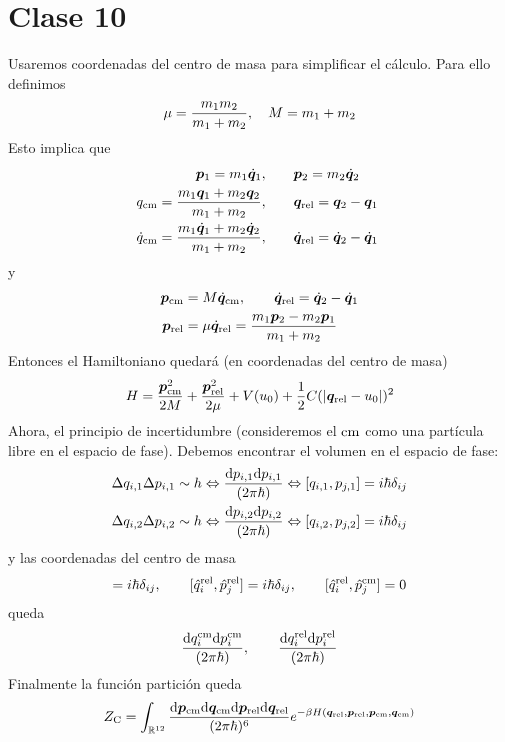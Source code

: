 \section{Clase 10}
Usaremos coordenadas del centro de masa para simplificar el cálculo. Para ello definimos
\begin{equation}
  \m =\frac{m_1m_2}{m_1+m_2},\quad M=m_1+m_2
\end{equation}
Esto implica que
\begin{align}
  \vec{p}_1=m_1\dot{\vec{q}}_1,&\qquad \vec{p}_2=m_2\dot{\vec{q}}_2\\
  q_{\rm cm}=\frac{m_1\vec{q}_1+m_2\vec{q}_2}{m_1+m_2},&\qquad \vec{q}_{\rm rel}=\vec{q}_2-\vec{q}_1\\
   \dot{q}_{\rm cm}=\frac{m_1\dot{\vec{q}}_1+m_2\dot{\vec{q}}_2}{m_1+m_2},&\qquad \dot{\vec{q}}_{\rm rel}=\dot{\vec{q}}_2-\dot{\vec{q}}_1\
\end{align}
y
\begin{align}
  \vec{p}_{\rm cm}&=M\dot{\vec{q}}_{\rm cm},\qquad \dot{\vec{q}}_{\rm rel}=\dot{\vec{q}}_2-\dot{\vec{q}}_1\\
  \vec{p}_{\rm rel}&=\m \dot{\vec{q}}_{\rm rel}=\frac{m_1\vec{p}_2-m_2\vec{p}_1}{m_1+m_2}
\end{align}
Entonces el Hamiltoniano quedará (en coordenadas del centro de masa)
\begin{equation}
  H=\frac{\vec{p}_{\rm cm}^2}{2M}+\frac{\vec{p}_{\rm rel}^2}{2\m }+V(u_0)+\frac{1}{2}C(|\vec	{q}_{\rm rel}-u_0|)^2
\end{equation}
Ahora, el principio de incertidumbre (consideremos el $\rm cm$ como una partícula libre en el espacio de fase). Debemos encontrar el volumen en el espacio de fase:
\begin{align}
  \Delta q_{i,1}\Delta p_{i,1}\sim h \Leftrightarrow\frac{\dd p_{i,1}\dd p_{i,1}}{(2\p \hbar)}\Leftrightarrow [q_{i,1},p_{j,1}]=i\hbar\delta_{ij}\\
  \Delta q_{i,2}\Delta p_{i,2}\sim h \Leftrightarrow\frac{\dd p_{i,2}\dd p_{i,2}}{(2\p \hbar)}\Leftrightarrow [q_{i,2},p_{j,2}]=i\hbar\delta_{ij}
\end{align}
y las coordenadas del centro de masa
\begin{align}
  [\hat{q}_i^{\rm cm},\hat{p}_j^{\rm cm}]=i\hbar\delta_{ij},\qquad [\hat{q}_i^{\rm rel},\hat{p}_j^{\rm rel}]=i\hbar\delta_{ij},\qquad [\hat{q}_i^{\rm rel},\hat{p}_j^{\rm cm}]=0
\end{align}
queda
\begin{align}
  \frac{\dd q_i^{\rm cm}\dd p_i^{\rm cm}}{(2\p \hbar)},\qquad \frac{\dd q_i^{\rm rel}\dd p_i^{\rm rel}}{(2\p \hbar)}
\end{align}
Finalmente la función partición queda
\begin{align}
  \zc =\int_{\mathbb{R}^{12}}\frac{\dd\vec{p}_{\rm cm}\dd\vec{q}_{\rm cm}\dd\vec{p}_{\rm rel}\dd\vec{q}_{\rm rel}}{(2\p \hbar)^6}e^{-\b H(\vec{q}_{\rm rel},\vec{p}_{\rm rel},\vec{p}_{\rm cm},\vec{q}_{\rm cm})}
\end{align}


